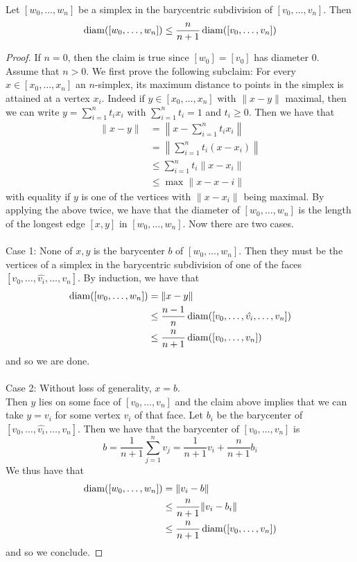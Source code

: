\documentclass[a4paper]{article}
\begin{document}
\begin{lmm}{}{} Let $[w_0,\dots,w_n]$ be a simplex in the barycentric subdivision of $[v_0,\dots,v_n]$. Then $$\operatorname{diam}([w_0,\dots,w_n])\leq\frac{n}{n+1}\operatorname{diam}([v_0,\dots,v_n])$$ \tcbline
\begin{proof}
If $n=0$, then the claim is true since $[w_0]=[v_0]$ has diameter $0$. Assume that $n>0$. We first prove the following subclaim: For every $x\in[x_0,\dots,x_n]$ an $n$-simplex, its maximum distance to points in the simplex is attained at a vertex $x_i$. Indeed if $y\in[x_0,\dots,x_n]$ with $\|x-y\|$ maximal, then we can write $y=\sum_{i=1}^nt_ix_i$ with $\sum_{i=1}^nt_i=1$ and $t_i\geq 0$. Then we have that 
\begin{align*}
\|x-y\|&=\left\|x-\sum_{i=1}^nt_ix_i\right\|\\
&=\left\|\sum_{i=1}^nt_i(x-x_i)\right\|\\
&\leq\sum_{i=1}^nt_i\|x-x_i\|\\
&\leq\max\|x-x-i\|
\end{align*}
with equality if $y$ is one of the vertices with $\|x-x_i\|$ being maximal. By applying the above twice, we have that the diameter of $[w_0,\dots,w_n]$ is the length of the longest edge $[x,y]$ in $[w_0,\dots,w_n]$. Now there are two cases. \\~\\

Case 1: None of $x,y$ is the barycenter $b$ of $[w_0,\dots,w_n]$. Then they must be the vertices of a simplex in the barycentric subdivision of one of the faces $[v_0,\dots,\hat{v_i},\dots,v_n]$. By induction, we have that 
\begin{align*}
\operatorname{diam}([w_0,\dots,w_n])&=\|x-y\|\\
&\leq\frac{n-1}{n}\operatorname{diam}([v_0,\dots,\hat{v_i},\dots,v_n])\\
&\leq\frac{n}{n+1}\operatorname{diam}([v_0,\dots,v_n])
\end{align*}
and so we are done. \\~\\

Case 2: Without loss of generality, $x=b$. \\
Then $y$ lies on some face of $[v_0,\dots,v_n]$ and the claim above implies that we can take $y=v_i$ for some vertex $v_i$ of that face. Let $b_i$ be the barycenter of $[v_0,\dots,\hat{v_i},\dots,v_n]$. Then we have that the barycenter of $[v_0,\dots,v_n]$ is $$b=\frac{1}{n+1}\sum_{j=1}^nv_j=\frac{1}{n+1}v_i+\frac{n}{n+1}b_i$$ We thus have that 
\begin{align*}
\operatorname{diam}([w_0,\dots,w_n])&=\|v_i-b\|\\
&\leq\frac{n}{n+1}\|v_i-b_i\|\\
&\leq\frac{n}{n+1}\operatorname{diam}([v_0,\dots,v_n])
\end{align*}
and so we conclude. 
\end{proof}
\end{lmm}
\end{document}
